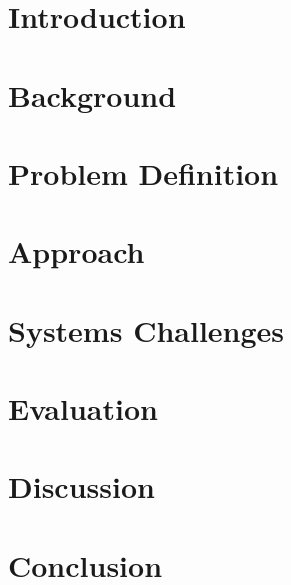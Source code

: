 \section{Introduction}
\label{sec:introduction}


\section{Background}
\label{sec:overview}


\section{Problem Definition}
\label{sec:formalism}


\section{Approach}
\label{sec:approach}


\section{Systems Challenges}
\label{sec:architecture}
\label{sec:systems_challenges}

%
\section{Evaluation}
\label{sec:evaluation}

%
\section{Discussion}
\label{sec:discussion}


\section{Conclusion}
\label{sec:conclusion}

